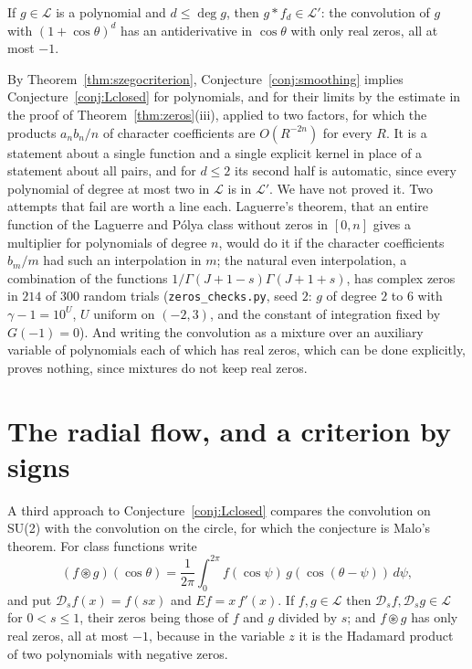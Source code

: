 \begin{conjecture}[smoothing]\label{conj:smoothing}
If $g\in\mathcal L$ is a polynomial and $d\le\deg g$, then $g*f_d\in\mathcal L'$: the convolution of $g$ with $(1+\cos\theta)^d$ has an antiderivative in $\cos\theta$ with only real zeros, all at most $-1$.
\end{conjecture}

By Theorem~\ref{thm:szegocriterion}, Conjecture~\ref{conj:smoothing} implies Conjecture~\ref{conj:Lclosed} for polynomials, and for their limits by the estimate in the proof of Theorem~\ref{thm:zeros}(iii), applied to two factors, for which the products $a_nb_n/n$ of character coefficients are $O(R^{-2n})$ for every $R$. It is a statement about a single function and a single explicit kernel in place of a statement about all pairs, and for $d\le2$ its second half is automatic, since every polynomial of degree at most two in $\mathcal L$ is in $\mathcal L'$. We have not proved it. Two attempts that fail are worth a line each. Laguerre's theorem, that an entire function of the Laguerre and P\'olya class without zeros in $[0,n]$ gives a multiplier for polynomials of degree $n$, would do it if the character coefficients $b_m/m$ had such an interpolation in $m$; the natural even interpolation, a combination of the functions $1/\Gamma(J+1-s)\Gamma(J+1+s)$, has complex zeros in $214$ of $300$ random trials (\texttt{zeros\_checks.py}, seed $2$: $g$ of degree $2$ to $6$ with $\gamma-1=10^U$, $U$ uniform on $(-2,3)$, and the constant of integration fixed by $G(-1)=0$). And writing the convolution as a mixture over an auxiliary variable of polynomials each of which has real zeros, which can be done explicitly, proves nothing, since mixtures do not keep real zeros.

\section{The radial flow, and a criterion by signs}\label{sec:radial}

A third approach to Conjecture~\ref{conj:Lclosed} compares the convolution on SU(2) with the convolution on the circle, for which the conjecture is Malo's theorem. For class functions write
\[
(f\circledast g)(\cos\theta)=\frac1{2\pi}\int_0^{2\pi}f(\cos\psi)\,g(\cos(\theta-\psi))\,d\psi,
\]
and put $\mathcal D_sf(x)=f(sx)$ and $Ef=x\,f'(x)$.
If $f,g\in\mathcal L$ then $\mathcal D_sf,\mathcal D_sg\in\mathcal L$ for $0<s\le1$, their zeros being those of $f$ and $g$ divided by $s$; and $f\circledast g$ has only real zeros, all at most $-1$, because in the variable $z$ it is the Hadamard product of two polynomials with negative zeros.

